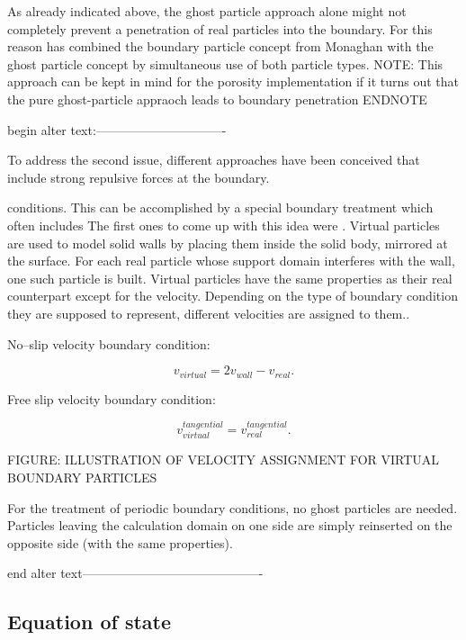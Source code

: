 \documentclass{report}
\begin{document}
As already indicated above, the ghost particle approach alone might not completely prevent a penetration of real particles into the boundary. For this reason \cite{Liu2002} has combined the boundary particle concept from Monaghan with the ghost particle concept by simultaneous use of both particle types.  NOTE: This approach can be kept in mind for the porosity implementation if it turns out that the pure ghost-particle appraoch leads to boundary penetration ENDNOTE


begin alter text:-------------------------------

 To address the second issue, different approaches have been conceived that include strong repulsive forces at the boundary.

conditions. This can be accomplished by a special boundary treatment which
often includes  The first ones to come up with this idea were
\cite{LIBERSKY1993}. Virtual particles are used to model solid walls by
placing them inside the solid body, mirrored at the surface. For each real
particle whose support domain interferes with the wall, one such particle is
built. Virtual particles have the same properties as their real counterpart
except for the velocity. Depending on the type of boundary condition they are
supposed to represent, different velocities are assigned to them.\cite{Hu2006}.

No--slip velocity boundary condition:

\begin{equation}
v_{virtual}=2v_{wall}-v_{real}.
\end{equation}

Free slip velocity boundary condition:

\begin{equation}
v_{virtual}^{tangential}=v_{real}^{tangential}.
\end{equation}

FIGURE: ILLUSTRATION OF VELOCITY ASSIGNMENT FOR VIRTUAL BOUNDARY PARTICLES

For the treatment of periodic boundary conditions, no ghost particles are
needed. Particles leaving the calculation domain on one side are simply
reinserted on the opposite side (with the same properties).

end alter text-------------------------------------------

\subsection{Equation of state}
\end{document}
